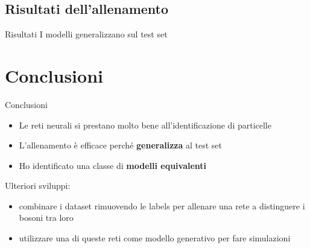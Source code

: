 \documentclass{beamer}
\begin{document}
\subsection{Risultati dell'allenamento}
\begin{frame}{Risultati}
  I modelli generalizzano sul test set
  \begin{figure}
  \end{figure}
\end{frame}


\section{Conclusioni}
\begin{frame}{Conclusioni}
  \begin{itemize}
    \item Le reti neurali si prestano molto bene all'identificazione di particelle
    \item L'allenamento è efficace perché \textbf{generalizza} al test set
    \item Ho identificato una classe di \textbf{modelli equivalenti}
  \end{itemize}
  \vspace{2ex}

  Ulteriori sviluppi: 
  \begin{itemize}
    \item combinare i dataset rimuovendo le labels per allenare una rete a distinguere i bosoni tra loro
    \item utilizzare una di queste reti come modello generativo per fare simulazioni 
  \end{itemize}
%
    \begin{columns}
      {
        \begin{block}{}
          \centering\vspace*{.5ex}
        \vspace*{.5ex}
      \end{block}
      }
    \end{columns}
\end{frame}
\end{document}
